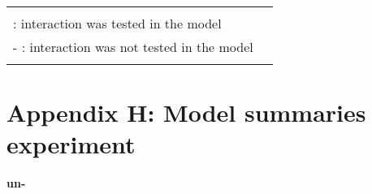 \begin{table}
{\begin{tabular} {llrrrrr}
	\midrule \\
	\multicolumn{6}{l}{\small \checkmark \hspace*{0.2cm}: interaction was tested in the model} & \\			
	\multicolumn{6}{l}{\small - \hspace*{0.45cm}: interaction was not tested in the model} & \\			
	& 
			\end{tabular}
}

\vspace*{-0.5cm}
\end{table}


\clearpage


\section*{Appendix H: Model summaries experiment} \label{Appendix H: Model Summaries Experiment}

\textbf{{un-}}

\vspace*{-0.3cm}

